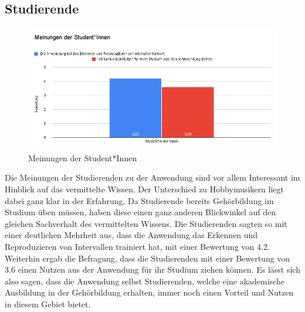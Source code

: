 \subsection*{Studierende}
\begin{figure}[H]
    \centering
    \includegraphics[width=1\textwidth]{Bilder/eval-meinungenStudis.png}
    \caption{Meinungen der Student*Innen}
\end{figure}
Die Meinungen der Studierenden zu der Anwendung sind vor allem Interessant im Hinblick auf das vermittelte Wissen. Der Unterschied zu Hobbymusikern liegt dabei ganz klar in der Erfahrung. Da Studierende bereits Gehörbildung im Studium üben müssen, haben diese einen ganz anderen Blickwinkel auf den gleichen Sachverhalt des vermittelten Wissens. Die Studierenden sagten so mit einer deutlichen Mehrheit aus, dass die Anwendung das Erkennen und Reproduzieren von Intervallen trainiert hat, mit einer Bewertung von 4.2. Weiterhin ergab die Befragung, dass die Studierenden mit einer Bewertung von 3.6 einen Nutzen aus der Anwendung für ihr Studium ziehen können. Es lässt sich also sagen, dass die Anwendung selbst Studierenden, welche eine akademische Ausbildung in der Gehörbildung erhalten, immer noch einen Vorteil und Nutzen in diesem Gebiet bietet. 

